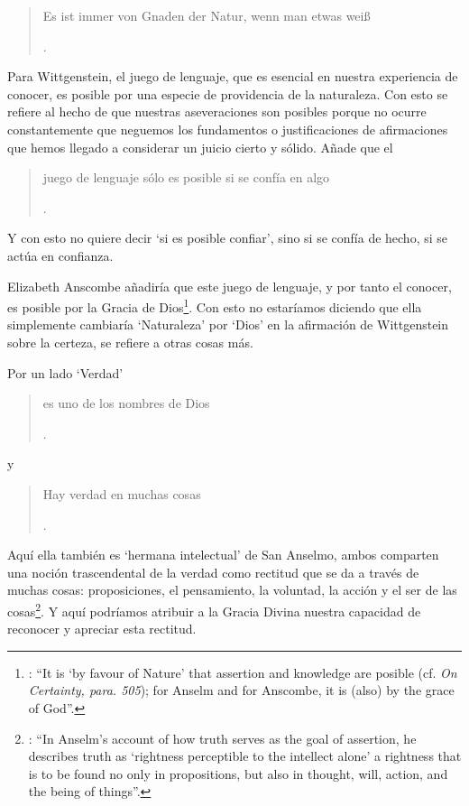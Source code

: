 \label{subsec:providencia}
\blockquote[{\Cite[\S505]{wittgenstein1969oncertes}}.]{Es ist immer von Gnaden der Natur, wenn man etwas weiß}. Para Wittgenstein, el juego de lenguaje, que es esencial en nuestra experiencia de conocer, es posible por una especie de providencia de la naturaleza. Con esto se refiere al hecho de que nuestras aseveraciones son posibles porque no ocurre constantemente que neguemos los fundamentos o justificaciones de afirmaciones que hemos llegado a considerar un juicio cierto y sólido. Añade que el \blockquote[{\Cite[\S509]{wittgenstein1969oncertes}}.]{juego de lenguaje sólo es posible si se confía en algo}. Y con esto no quiere decir \enquote*{si es posible confiar}, sino si se confía de hecho, si se actúa en confianza.

Elizabeth Anscombe añadiría que este juego de lenguaje, y por tanto el conocer, es posible por la Gracia de Dios\footnote{\Cite[Cf.][224]{teichmann2008ans}: \enquote{It is `by favour of Nature' that assertion and knowledge are posible (cf. \emph{On Certainty, para. 505}); for Anselm and for Anscombe, it is (also) by the grace of God}.}. Con esto no estaríamos diciendo que ella simplemente cambiaría `Naturaleza' por `Dios' en la afirmación de Wittgenstein sobre la certeza, se refiere a otras cosas más.

Por un lado `Verdad' \blockquote[{\Cite[47]{torralbaynubiola2005fayeh:verdad}}.]{es uno de los nombres de Dios} y \blockquote[{\Cite[47]{torralbaynubiola2005fayeh:verdad}}.]{Hay verdad en muchas cosas}. Aquí ella también es `hermana intelectual' de San Anselmo, ambos comparten una noción trascendental de la verdad como rectitud que se da a través de muchas cosas: proposiciones, el pensamiento, la voluntad, la acción y el ser de las cosas\footnote{\Cite[Cf.][197]{teichmann2008ans}: \enquote{In Anselm's account of how truth serves as the goal of assertion, he describes truth as `rightness perceptible to the intellect alone' \textelp{} a rightness that is to be found no only in propositions, but also in thought, will, action, and the being of things}.}. Y aquí podríamos atribuir a la Gracia Divina nuestra capacidad de reconocer y apreciar esta rectitud.

